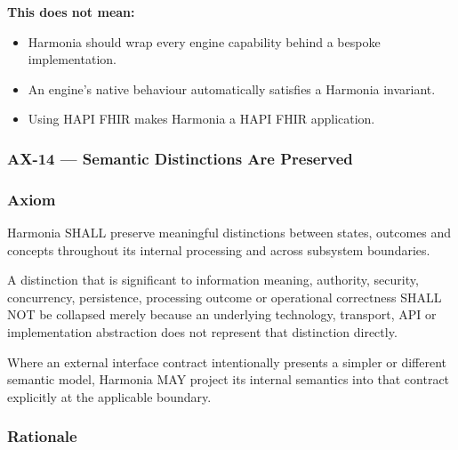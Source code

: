 \textbf{This does not mean:}

\label{rad:axioms:241}

\begin{itemize}

\item 
Harmonia should wrap every engine capability behind a bespoke implementation.



\item 
An engine's native behaviour automatically satisfies a Harmonia invariant.



\item 
Using HAPI FHIR makes Harmonia a HAPI FHIR application.



\end{itemize}
\label{rad:axioms:245}



\label{rad:axioms:668}
\subsubsection*{AX-14 — Semantic Distinctions Are Preserved}
\label{rad:axioms:669}
\subsubsection*{Axiom}
\label{rad:axioms:670}

Harmonia SHALL preserve meaningful distinctions between states, outcomes and concepts throughout its internal processing and across subsystem boundaries.

\label{rad:axioms:672}

A distinction that is significant to information meaning, authority, security, concurrency, persistence, processing outcome or operational correctness SHALL NOT be collapsed merely because an underlying technology, transport, API or implementation abstraction does not represent that distinction directly.

\label{rad:axioms:674}

Where an external interface contract intentionally presents a simpler or different semantic model, Harmonia MAY project its internal semantics into that contract explicitly at the applicable boundary.

\label{rad:axioms:676}
\subsubsection*{Rationale}
\label{rad:axioms:677}

